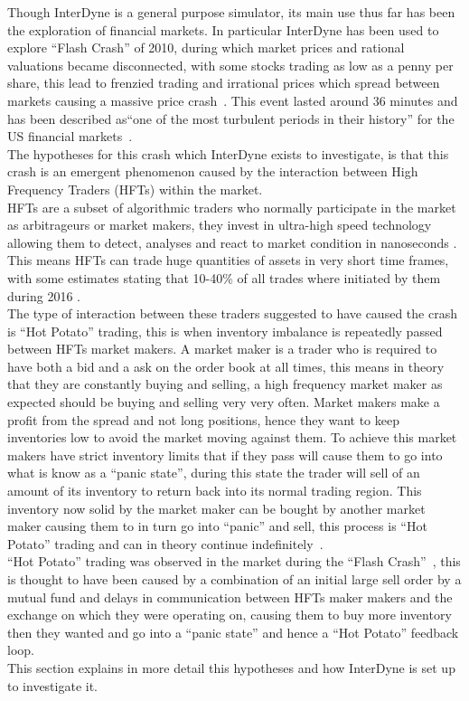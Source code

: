 \documentclass{article}
\begin{document}
Though InterDyne is a general purpose simulator, its main use thus far has been the exploration of financial markets. In particular InterDyne has been used to explore ``Flash Crash'' of 2010, during which market prices and rational valuations became disconnected, with some stocks trading as low as a penny per share, this lead to frenzied trading and irrational prices which spread between markets causing a massive price crash~\cite{SECreport_delays}. This event lasted around 36 minutes and has been described as``one of the most turbulent periods in their history'' for the US financial markets~\cite{Impact_hft}.\\
The hypotheses for this crash which InterDyne exists to investigate, is that this crash is an emergent phenomenon caused by the interaction between High Frequency Traders (HFTs) within the market.\\
HFTs are a subset of algorithmic traders who normally participate in the market as arbitrageurs or market makers, they invest in ultra-high speed technology allowing them to detect, analyses and react to market condition in nanoseconds \cite{hftinformation1}. This means HFTs can trade huge quantities of assets in very short time frames, with some estimates stating that 10-40\% of all trades where initiated by them during 2016 \cite{hftmarketparticipation}.\\
The type of interaction between these traders suggested to have caused the crash is ``Hot Potato'' trading, this is when inventory imbalance is repeatedly passed between HFTs market makers. A market maker is a trader who is required to have both a bid and a ask on the order book at all times, this means in theory that they are constantly buying and selling, a high frequency market maker as expected should be buying and selling very very often. Market makers make a profit from the spread and not long positions, hence they want to keep inventories low to avoid the market moving against them. To achieve this market makers have strict inventory limits that if they pass will cause them to go into what is know as a ``panic state'', during this state the trader will sell of an amount of its inventory to return back into its normal trading region. This inventory now solid by the market maker can be bought by another market maker causing them to in turn go into ``panic'' and sell, this process is ``Hot Potato'' trading and can in theory continue indefinitely~\cite{Elias_Paper}.\\
``Hot Potato'' trading was observed in the market during the ``Flash Crash''~\cite{SECreport_delays}, this is thought to have been caused by a combination of an initial large sell order by a mutual fund and delays in communication between HFTs maker makers and the exchange on which they were operating on, causing them to buy more inventory then they wanted and go into a ``panic state'' and hence a ``Hot Potato'' feedback loop.\\       %
This section explains in more detail this hypotheses and how InterDyne is set up to investigate it.  
\end{document}
